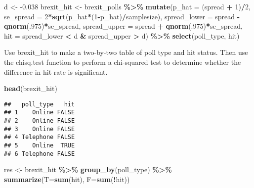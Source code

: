 \documentclass[
]{article}
\newenvironment{Shaded}{\begin{snugshade}}{\end{snugshade}}
\newcommand{\DataTypeTok}[1]{\textcolor[rgb]{0.13,0.29,0.53}{#1}}
\newcommand{\DecValTok}[1]{\textcolor[rgb]{0.00,0.00,0.81}{#1}}
\newcommand{\FloatTok}[1]{\textcolor[rgb]{0.00,0.00,0.81}{#1}}
\newcommand{\KeywordTok}[1]{\textcolor[rgb]{0.13,0.29,0.53}{\textbf{#1}}}
\newcommand{\NormalTok}[1]{#1}
\newcommand{\OperatorTok}[1]{\textcolor[rgb]{0.81,0.36,0.00}{\textbf{#1}}}
\newcommand{\StringTok}[1]{\textcolor[rgb]{0.31,0.60,0.02}{#1}}
\begin{document}
\begin{Shaded}
\begin{Highlighting}[]
\NormalTok{d \textless{}{-}}\StringTok{ }\FloatTok{{-}0.038}
\NormalTok{brexit\_hit \textless{}{-}}\StringTok{ }\NormalTok{brexit\_polls }\OperatorTok{\%\textgreater{}\%}
\StringTok{  }\KeywordTok{mutate}\NormalTok{(}\DataTypeTok{p\_hat =}\NormalTok{ (spread }\OperatorTok{+}\StringTok{ }\DecValTok{1}\NormalTok{)}\OperatorTok{/}\DecValTok{2}\NormalTok{,}
         \DataTypeTok{se\_spread =} \DecValTok{2}\OperatorTok{*}\KeywordTok{sqrt}\NormalTok{(p\_hat}\OperatorTok{*}\NormalTok{(}\DecValTok{1}\OperatorTok{{-}}\NormalTok{p\_hat)}\OperatorTok{/}\NormalTok{samplesize),}
         \DataTypeTok{spread\_lower =}\NormalTok{ spread }\OperatorTok{{-}}\StringTok{ }\KeywordTok{qnorm}\NormalTok{(.}\DecValTok{975}\NormalTok{)}\OperatorTok{*}\NormalTok{se\_spread,}
         \DataTypeTok{spread\_upper =}\NormalTok{ spread }\OperatorTok{+}\StringTok{ }\KeywordTok{qnorm}\NormalTok{(.}\DecValTok{975}\NormalTok{)}\OperatorTok{*}\NormalTok{se\_spread,}
         \DataTypeTok{hit =}\NormalTok{ spread\_lower }\OperatorTok{\textless{}}\StringTok{ }\NormalTok{d }\OperatorTok{\&}\StringTok{ }\NormalTok{spread\_upper }\OperatorTok{\textgreater{}}\StringTok{ }\NormalTok{d) }\OperatorTok{\%\textgreater{}\%}
\StringTok{  }\KeywordTok{select}\NormalTok{(poll\_type, hit)}
\end{Highlighting}
\end{Shaded}

Use brexit\_hit to make a two-by-two table of poll type and hit status.
Then use the chisq.test function to perform a chi-squared test to
determine whether the difference in hit rate is significant.

\begin{Shaded}
\begin{Highlighting}[]
\KeywordTok{head}\NormalTok{(brexit\_hit)}
\end{Highlighting}
\end{Shaded}

\begin{verbatim}
##   poll_type   hit
## 1    Online FALSE
## 2    Online FALSE
## 3    Online FALSE
## 4 Telephone FALSE
## 5    Online  TRUE
## 6 Telephone FALSE
\end{verbatim}

\begin{Shaded}
\begin{Highlighting}[]
\NormalTok{res \textless{}{-}}\StringTok{ }\NormalTok{brexit\_hit }\OperatorTok{\%\textgreater{}\%}\StringTok{ }
\StringTok{  }\KeywordTok{group\_by}\NormalTok{(poll\_type) }\OperatorTok{\%\textgreater{}\%}
\StringTok{  }\KeywordTok{summarize}\NormalTok{(}\DataTypeTok{T=}\KeywordTok{sum}\NormalTok{(hit), }\DataTypeTok{F=}\KeywordTok{sum}\NormalTok{(}\OperatorTok{!}\NormalTok{hit))}
\end{Highlighting}
\end{Shaded}
\end{document}
